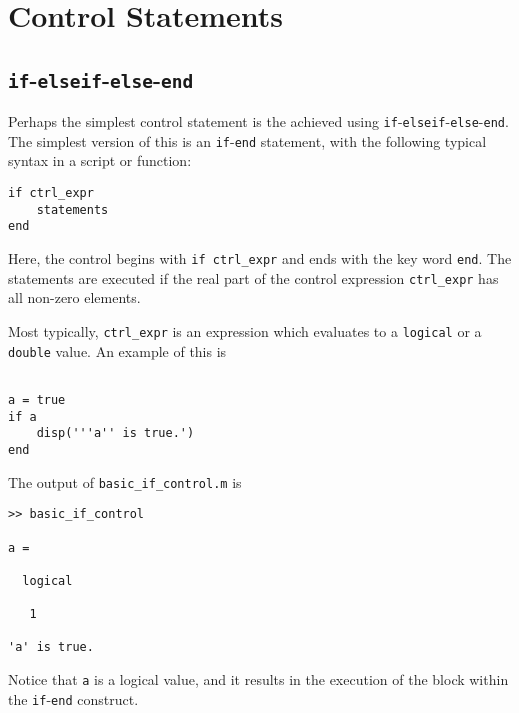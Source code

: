 \appendix

\section{Control Statements}


\subsection{\texttt{if}-\texttt{elseif}-\texttt{else}-\texttt{end}}
Perhaps the simplest control statement is the achieved using \texttt{if}-\texttt{elseif}-\texttt{else}-\texttt{end}. The simplest version of this is an \texttt{if}-\texttt{end} statement, with the following typical syntax in a script or function:
\begin{lstlisting}[style=Matlab-editor]
if ctrl_expr
	statements
end
\end{lstlisting}
Here, the control begins with \verb!if ctrl_expr! and ends with the key word \texttt{end}. The statements are executed if the real part of the control expression \verb!ctrl_expr! has all non-zero elements.

Most typically, \verb!ctrl_expr! is an expression which evaluates to a \texttt{logical} or a \texttt{double} value. An example of this is
\begin{lstlisting}[style=Matlab-editor]
% basic_if_control.m

a = true
if a
    disp('''a'' is true.')
end
\end{lstlisting}
The output of \verb!basic_if_control.m! is
\begin{lstlisting}[style=Matlab-editor]
>> basic_if_control

a =

  logical

   1

'a' is true.
\end{lstlisting}
Notice that \texttt{a} is a logical value, and it results in the execution of the block within the \texttt{if}-\texttt{end} construct.

